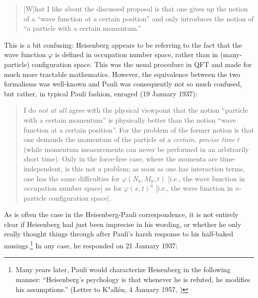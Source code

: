 \documentclass[12pt]{article}
\begin{document}
\begin{quote}
[W]hat I like about the discussed proposal is that one gives up the notion of a ``wave function at a certain position'' and only introduces the notion of ``a particle with a certain momentum.''
\end{quote}

This is a bit confusing: Heisenberg appears to be referring to the fact that the wave function $\varphi$ is defined in occupation number space, rather than in (many-particle) configuration space. This was the usual procedure in QFT and made for much more tractable mathematics. However, the equivalence between the two formalisms was well-known and Pauli was consequently not so much confused, but rather, in typical Pauli fashion, enraged (19 January 1937):

\begin{quote}
I do \emph{not at all} agree with the physical viewpoint that the notion ``particle with a certain momentum'' is physically better than the notion ``wave function at a certain position''. For the problem of the former notion is that one demands the momentum of the particle \emph{at a certain, precise time} $t$ (while momentum measurements can never be performed in an arbitrarily short time). Only in the force-free case, where the momenta are time-independent, is this not a problem; as soon as one has interaction terms, one has the same difficulties for $\varphi (N_k, M_k, t)$ [i.e., the wave function in occupation number space] as for $\varphi(x,t)^n$ [i.e., the wave function in $n$-particle configuration space].
 \end{quote}
 
As is often the case in the Heisenberg-Pauli correspondence, it is not entirely clear if Heisenberg had just been imprecise in his wording, or whether he only really thought things through after Pauli's harsh response to his half-baked musings.\footnote{Many years later, Pauli would characterize Heisenberg in the following manner: ``Heisenberg's psychology is that whenever he is refuted, he modifies his assumptions.'' (Letter to K"all\'en, 4 January 1957, \citep{meyenn_2005_wissenschaftlicher})} In any case, he responded on 21 January 1937:
\end{document}
